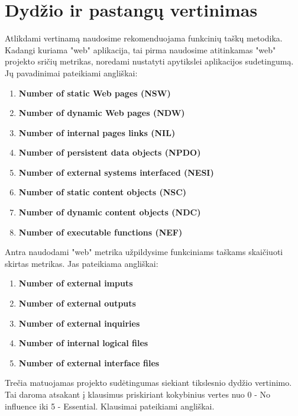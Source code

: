 \documentclass[a4paper,12pt]{article}
\begin{document}
\section{ Dydžio ir pastangų vertinimas}
Atlikdami vertinamą naudosime rekomenduojama funkcinių taškų metodika. Kadangi kuriama "web" aplikacija, tai pirma naudosime atitinkamas "web" projekto sričių metrikas, noredami nustatyti apytikslei aplikacijos sudetingumą. Jų pavadinimai pateikiami angliškai:
\begin{enumerate}
\item \textbf{Number of static Web pages (NSW)}
\item \textbf{Number of dynamic Web pages (NDW)}
\item \textbf{Number of internal pages links (NIL)}
\item \textbf{Number of persistent data objects (NPDO)}
\item \textbf{Number of external systems interfaced (NESI)}
\item \textbf{Number of static content objects (NSC)}
\item \textbf{Number of dynamic content objects (NDC)}
\item \textbf{Number of executable functions
(NEF)}
\end{enumerate}
Antra naudodami "web" metrika užpildysime funkciniams taškams skaičiuoti skirtas metrikas.
Jas pateikiama angliškai:
\begin{enumerate}
\item \textbf{Number of external imputs}
\item \textbf{Number of external outputs}
\item \textbf{Number of external inquiries}
\item \textbf{Number of internal logical files}
\item \textbf{Number of external interface files}
\end{enumerate}
Trečia matuojamas projekto sudėtingumas siekiant tikslesnio dydžio vertinimo. Tai daroma atsakant į klausimus priskiriant kokybinius vertes nuo 0 - No influence iki 5 - Essential. Klausimai pateikiami angliškai.
\end{document}
